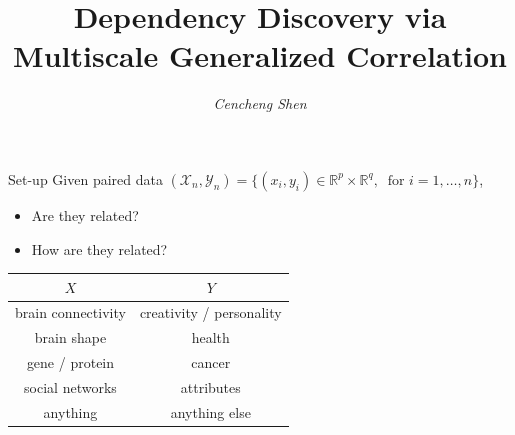 \documentclass[mathserif,t]{beamer}
\title[MGC]{\fontfamily{qtm} \bfseries Dependency Discovery via\\
Multiscale Generalized Correlation}
\author[C. Shen]{\large\textcolor{UniTitle}{\textit{Cencheng Shen}}} %
\institute[JHU]{\footnotesize\color{UniTitle}\textit{University of Delaware}\\ %
\bigskip
\bigskip
\bigskip
\bigskip
\textit{Collaborators: Joshua T. Vogelstein, Carey E. Priebe, Shangsi Wang, Youjin Lee, Mauro Maggioni, Qing Wang, Alex Badea.\\
\medskip
Acknowledgment: NSF DMS, DARPA SIMPLEX.}}
\date{\footnotesize\color{UniTitle}\footnotesize\textit{}} %
\newcommand{\Real}{\mathbb{R}}
\newcommand{\Mgc}{MGC}
\begin{document}

\begin{frame}
\titlepage %
\end{frame}

\begin{frame}{Set-up}
\pause
Given paired data $(\mathcal{X}_{n},\mathcal{Y}_{n})=\{(x_{i},y_{i}) \in \Real^{p} \times \Real^{q}, \ \mbox{ for } i=1,\ldots,n\}$,
\pause
\begin{itemize}[<+->]
\item Are they related?
\item How are they related?
\end{itemize}
\pause
\medskip

\begin{table}
\centering
\begin{tabular}{|c|c|}
\hline
\textbf{$X$} & \textbf{$Y$}   \\
\hline
brain connectivity  & creativity / personality \\
\hline 
brain shape & health \\
\hline
gene / protein & cancer\\
\hline
social networks & attributes \\
\hline
anything & anything else \\
\hline
\end{tabular}
\end{table}
\end{frame}
\end{document}
